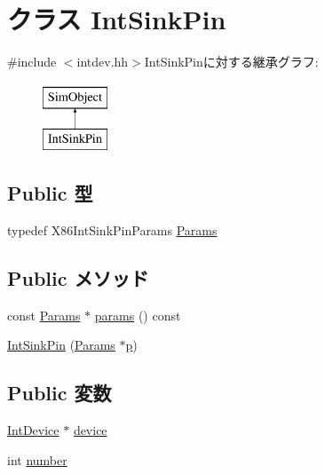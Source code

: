 \hypertarget{classX86ISA_1_1IntSinkPin}{
\section{クラス IntSinkPin}
\label{classX86ISA_1_1IntSinkPin}
}


{\ttfamily \#include $<$intdev.hh$>$}IntSinkPinに対する継承グラフ:\begin{figure}[H]
\begin{center}
\leavevmode
\includegraphics[height=2cm]{classX86ISA_1_1IntSinkPin}
\end{center}
\end{figure}
\subsection*{Public 型}
\begin{DoxyCompactItemize}
\item 
typedef X86IntSinkPinParams \hyperlink{classX86ISA_1_1IntSinkPin_abcff199e0151f4485ac2e6deceb56b31}{Params}
\end{DoxyCompactItemize}
\subsection*{Public メソッド}
\begin{DoxyCompactItemize}
\item 
const \hyperlink{classX86ISA_1_1IntSinkPin_abcff199e0151f4485ac2e6deceb56b31}{Params} $\ast$ \hyperlink{classX86ISA_1_1IntSinkPin_acd3c3feb78ae7a8f88fe0f110a718dff}{params} () const 
\item 
\hyperlink{classX86ISA_1_1IntSinkPin_a46936e67518f4922d0bd3ad09fa25587}{IntSinkPin} (\hyperlink{classX86ISA_1_1IntSinkPin_abcff199e0151f4485ac2e6deceb56b31}{Params} $\ast$\hyperlink{namespaceX86ISA_af675c1d542a25b96e11164b80809a856}{p})
\end{DoxyCompactItemize}
\subsection*{Public 変数}
\begin{DoxyCompactItemize}
\item 
\hyperlink{classX86ISA_1_1IntDevice}{IntDevice} $\ast$ \hyperlink{classX86ISA_1_1IntSinkPin_a213401fbaf58b821f38f6e274ddafadc}{device}
\item 
int \hyperlink{classX86ISA_1_1IntSinkPin_a7106e2abc437ad981830d14176d15f09}{number}
\end{DoxyCompactItemize}


